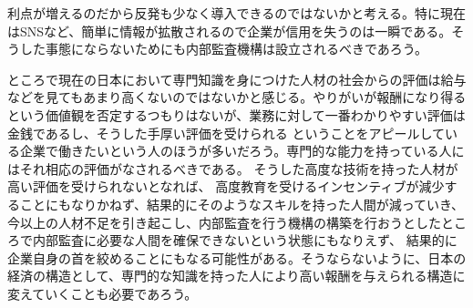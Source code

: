 \documentclass[12pt]{jsarticle}
\begin{document}
利点が増えるのだから反発も少なく導入できるのではないかと考える。特に現在はSNSなど、簡単に情報が拡散されるので企業が信用を失うのは一瞬である。そうした事態にならないためにも内部監査機構は設立されるべきであろう。
\par ところで現在の日本において専門知識を身につけた人材の社会からの評価は給与などを見てもあまり高くないのではないかと感じる。やりがいが報酬になり得るという価値観を否定するつもりはないが、業務に対して一番わかりやすい評価は金銭であるし、そうした手厚い評価を受けられる
ということをアピールしている企業で働きたいという人のほうが多いだろう。専門的な能力を持っている人にはそれ相応の評価がなされるべきである。
そうした高度な技術を持った人材が高い評価を受けられないとなれば、 高度教育を受けるインセンティブが減少することにもなりかねず、結果的にそのようなスキルを持った人間が減っていき、今以上の人材不足を引き起こし、内部監査を行う機構の構築を行おうとしたところで内部監査に必要な人間を確保できないという状態にもなりえず、
結果的に企業自身の首を絞めることにもなる可能性がある。そうならないように、日本の経済の構造として、専門的な知識を持った人により高い報酬を与えられる構造に変えていくことも必要であろう。
\end{document}
